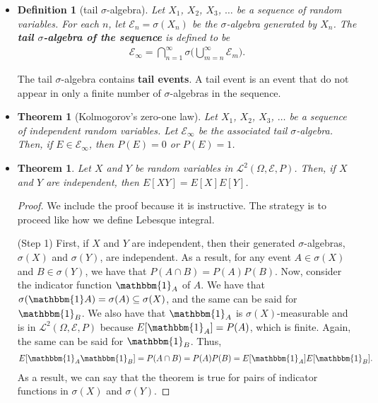 \documentclass[10pt]{article}
\newtheorem{theorem}[lemma]{Theorem}
\newtheorem{definition}[lemma]{Definition}
\numberwithin{lemma}{section}
\newcommand{\mcal}[1]{\mathcal{#1}}
\newcommand{\one}{\mathbbm{1}}
\begin{document}
\begin{itemize}
  \item \begin{definition}[tail $\sigma$-algebra]
    Let $X_1$, $X_2$, $X_3$, $\dotsc$ be a sequence of random variables. For each $n$, let $\mcal{E}_n = \sigma(X_n)$ be the $\sigma$-algebra generated by $X_n$. The {\bf tail $\sigma$-algebra of the sequence} is defined to be
    \begin{align*}
      \mcal{E}_\infty = \bigcap_{n=1}^\infty \sigma\bigg( \bigcup_{m = n}^\infty \mcal{E}_m \bigg).
    \end{align*}
  \end{definition}
  The tail $\sigma$-algebra contains {\bf tail events}. A tail event is an event that do not appear in only a finite number of $\sigma$-algebras in the sequence.

  \item \begin{theorem}[Kolmogorov's zero-one law]
    Let $X_1$, $X_2$, $X_3$, $\dotsc$ be a sequence of independent random variables. Let $\mcal{E}_\infty$ be the associated tail $\sigma$-algebra. Then, if $E \in \mcal{E}_\infty$, then $P(E) = 0$ or $P(E) = 1$.
  \end{theorem}

  \item \begin{theorem}
    Let $X$ and $Y$ be random variables in $\mcal{L}^2(\Omega, \mcal{E}, P)$. Then, if $X$ and $Y$ are independent, then $E[XY] = E[X]E[Y]$.
  \end{theorem}

  \begin{proof}
    We include the proof because it is instructive. The strategy is to proceed like how we define Lebesque integral. 
    
    (Step 1) First, if $X$ and $Y$ are independent, then their generated $\sigma$-algebras, $\sigma(X)$ and $\sigma(Y)$, are independent. As a result, for any event $A \in \sigma(X)$ and $B \in \sigma(Y)$, we have that $P(A \cap B) = P(A) P(B)$. Now, consider the indicator function $\one_A$ of $A$. We have that $\sigma(\one A) = \sigma(A) \subseteq \sigma(X)$, and the same can be said for $\one_B$. We also have that $\one_A$ is $\sigma(X)$-measurable and is in $\mcal{L}^2(\Omega, \mcal{E},P)$ because $E[\one_A] = P(A)$, which is finite. Again, the same can be said for $\one_B$. Thus,
    \begin{align*}
      E[\one_A \one_B] = P(A \cap B) = P(A)P(B) = E[\one_A] E[\one_B].
    \end{align*} 
    As a result, we can say that the theorem is true for pairs of indicator functions in $\sigma(X)$ and $\sigma(Y)$.


\end{proof}
\end{itemize}
\end{document}
